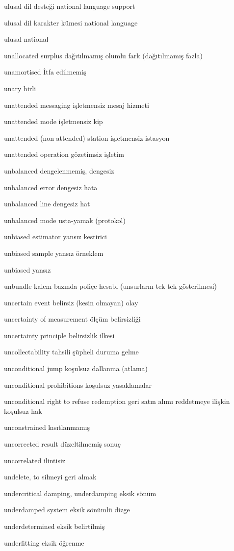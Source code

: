 \documentclass[12pt,fleqn]{article}\usepackage{../../common}
\begin{document}
ulusal dil desteği national language support

ulusal dil karakter kümesi national language

ulusal national

unallocated surplus dağıtılmamış olumlu fark (dağıtılmamış fazla)

unamortised İtfa edilmemiş

unary birli

unattended messaging işletmensiz mesaj hizmeti

unattended mode işletmensiz kip

unattended (non-attended) station işletmensiz istasyon

unattended operation gözetimsiz işletim

unbalanced dengelenmemiş, dengesiz

unbalanced error dengesiz hata

unbalanced line dengesiz hat

unbalanced mode usta-yamak (protokol)

unbiased estimator yansız kestirici

unbiased sample yansız örneklem

unbiased yansız

unbundle kalem bazında poliçe hesabı (unsurların tek tek gösterilmesi)

uncertain event belirsiz (kesin olmayan) olay

uncertainty of measurement ölçüm belirsizliği

uncertainty principle belirsizlik ilkesi

uncollectability tahsili şüpheli duruma gelme

unconditional jump koşulsuz dallanma (atlama)

unconditional prohibitions koşulsuz yasaklamalar

unconditional right to refuse redemption geri satın alımı reddetmeye ilişkin koşulsuz hak

unconstrained kısıtlanmamış

uncorrected result düzeltilmemiş sonuç

uncorrelated ilintisiz

undelete, to silmeyi geri almak

undercritical damping, underdamping eksik sönüm

underdamped system eksik sönümlü dizge

underdetermined eksik belirtilmiş

underfitting eksik öğrenme
\end{document}
